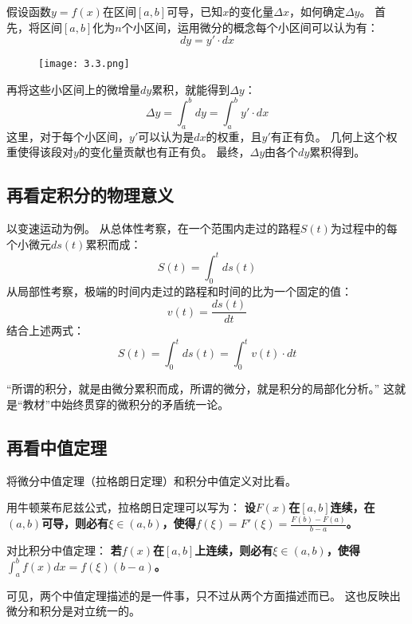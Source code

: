 假设函数$y=f\left( x \right) $在区间$\left[ a,b \right] $可导，已知$x$的变化量$\Delta x$，如何确定$\Delta y$。
首先，将区间$\left[ a,b \right] $化为$n$个小区间，运用微分的概念每个小区间可以认为有：
\[
dy=y'\cdot dx
\]
\begin{figure}[h]
\centering
\texttt{[image: 3.3.png]}
\end{figure}

再将这些小区间上的微增量$dy$累积，就能得到$\Delta y$：
\[
\Delta y=\int_a^b{dy}=\int_a^b{y'\cdot dx}
\]
这里，对于每个小区间，$y'$可以认为是$dx$的权重，且$y'$有正有负。
几何上这个权重使得该段对$y$的变化量贡献也有正有负。
最终，$\Delta y$由各个$dy$累积得到。

\subsection{再看定积分的物理意义}

以变速运动为例。
从总体性考察，在一个范围内走过的路程$S\left( t \right) $为过程中的每个小微元$ds\left( t \right)$累积而成：
\[
S\left( t \right) =\int_0^t{ds\left( t \right)}
\]
从局部性考察，极端的时间内走过的路程和时间的比为一个固定的值：
\[
v\left( t \right) =\frac{ds\left( t \right)}{dt}
\]
结合上述两式：
\[
S\left( t \right) =\int_0^t{ds\left( t \right)}=\int_0^t{v\left( t \right) \cdot dt}
\]

\begin{tcolorbox}
“所谓的积分，就是由微分累积而成，所谓的微分，就是积分的局部化分析。”
这就是“教材\cite{book2}”中始终贯穿的微积分的矛盾统一论。
\end{tcolorbox}

\subsection{再看中值定理}

将微分中值定理（拉格朗日定理）和积分中值定义对比看。

用牛顿莱布尼兹公式，拉格朗日定理可以写为：
{\bf 设$F\left( x \right) $在$\left[ a,b \right] $连续，在$\left( a,b \right) $可导，则必有$\xi \in \left( a,b \right) $，使得$f\left( \xi \right) =F'\left( \xi \right) =\frac{F\left( b \right) -F\left( a \right)}{b-a}$。}

对比积分中值定理：
{\bf 若$f\left( x \right) $在$\left[ a,b \right] $上连续，则必有$\xi \in \left( a,b \right) $，使得$\int_a^b{f\left( x \right) dx}=f\left( \xi \right) \left( b-a \right)$。}

可见，两个中值定理描述的是一件事，只不过从两个方面描述而已。
这也反映出微分和积分是对立统一的。




